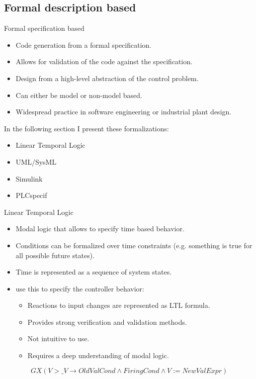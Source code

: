 \documentclass[18pt]{beamer}
\begin{document}
\subsection{Formal description based}

\begin{frame}{Formal specification based}
\begin{itemize}
    \item Code generation from a formal specification.
    \item Allows for validation of the code against the specification.
    \item Design from a high-level abstraction of the control problem.
    \item Can either be model or non-model based.
    \item Widespread practice in software engineering or industrial plant design.
\end{itemize}
In the following section I present these formalizations:
\begin{itemize}
    \item Linear Temporal Logic
    \item UML/SysML
    \item Simulink
    \item PLCspecif
\end{itemize}
\end{frame}

\begin{frame}{Linear Temporal Logic}
\begin{itemize}
	\item Modal logic that allows to specify time based behavior.
    \item Conditions can be formalized over time constraints (e.g. something is true for all possible future states).
	\item Time is represented as a sequence of system states.
    \item \cite{Kuzmin:2013} use this to specify the controller behavior:
    \begin{itemize}
        \item Reactions to input changes are represented as LTL formula.
        \item Provides strong verification and validation methods.
        \item Not intuitive to use.
        \item Requires a deep understanding of modal logic.
    \end{itemize}
\end{itemize}

\begin{equation}
GX\left(V > \_V \rightarrow OldValCond \land FiringCond \land V := NewValExpr \right)
\label{eq:increase}
\end{equation}

\end{frame}
\end{document}
